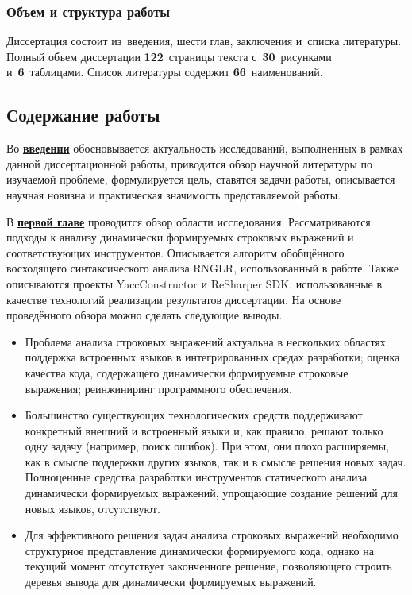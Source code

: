 \subsubsection*{\large{Объем и структура работы}}
Диссертация состоит из~введения, шести глав, заключения и~списка литературы. Полный объем диссертации \textbf{122}~страницы текста с~\textbf{30}~рисунками и~\textbf{6}~таблицами. Список литературы содержит \textbf{66}~наименований.

\subsection*{\Large Содержание работы}
Во \underline{\textbf{введении}} обосновывается актуальность исследований, выполненных в рамках данной диссертационной работы, приводится обзор научной литературы по изучаемой проблеме, формулируется цель, 
ставятся задачи работы, описывается научная новизна и практическая значимость представляемой работы.


В \underline{\textbf{первой главе}} проводится обзор области исследования. Рассматриваются подходы к анализу динамически формируемых строковых 
выражений и соответствующих инструментов. Описывается алгоритм обобщённого восходящего синтаксического анализа RNGLR, использованный в работе. Также описываются 
проекты YaccConstructor и ReSharper SDK, использованные в качестве технологий реализации результатов диссертации. На основе проведённого обзора можно сделать следующие выводы.

\begin{itemize}
    \item Проблема анализа строковых выражений актуальна в нескольких областях: поддержка встроенных языков в интегрированных средах разработки; оценка качества кода, содержащего динамически формируемые строковые выражения; реинжиниринг программного обеспечения.
    \item Большинство существующих технологических средств поддерживают конкретный внешний и встроенный языки и, как правило, решают только одну задачу (например, поиск ошибок). При этом, они плохо расширяемы, как в смысле поддержки других языков, так и в смысле решения новых задач. Полноценные средства разработки инструментов статического анализа динамически формируемых выражений, упрощающие создание решений для новых языков, отсутствуют.
    \item Для эффективного решения задач анализа строковых выражений необходимо структурное представление динамически формируемого кода, однако на текущий момент отсутствует законченноге решение, позволяющего строить деревья вывода для динамически формируемых выражений.
\end{itemize}

